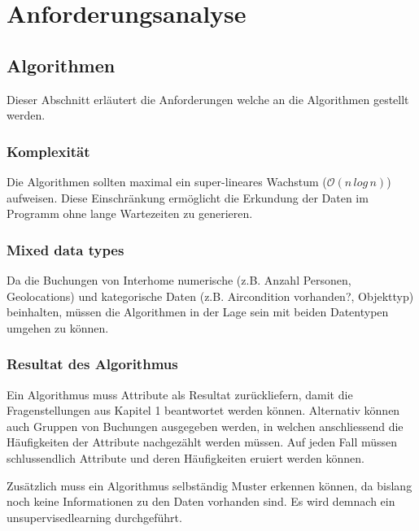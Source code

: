 

\chapter{Anforderungsanalyse}
\label{sec:anforderungsanalyse}

\section{Algorithmen}
\label{sec:anforderungsanalyse:algorithmen}
Dieser Abschnitt erläutert die Anforderungen welche an die Algorithmen gestellt werden.

\subsection{Komplexität}
\label{sec:anforderungsanalyse:algorithmen:komplexitaet}
Die Algorithmen sollten maximal ein super-lineares Wachstum ($\mathcal{O}(n\,log\,n)$) aufweisen. Diese Einschränkung ermöglicht die Erkundung der Daten im Programm ohne lange Wartezeiten zu generieren.

\subsection{Mixed data types}
\label{sec:anforderungsanalyse:algorithmen:mixed-data-types}
Da die Buchungen von Interhome numerische (z.B. Anzahl Personen, Geolocations) und kategorische Daten (z.B. Aircondition vorhanden?, Objekttyp) beinhalten, müssen die Algorithmen in der Lage sein mit beiden Datentypen umgehen zu können.

\subsection{Resultat des Algorithmus}
\label{sec:anforderungsanalyse:algorithmen:resultat}
Ein Algorithmus muss Attribute als Resultat zurückliefern, damit die Fragenstellungen aus Kapitel 1 beantwortet werden können. Alternativ können auch Gruppen von Buchungen ausgegeben werden, in welchen anschliessend die Häufigkeiten der Attribute nachgezählt werden müssen. Auf jeden Fall müssen schlussendlich Attribute und deren Häufigkeiten eruiert werden können.

Zusätzlich muss ein Algorithmus selbständig Muster erkennen können, da bislang noch keine Informationen zu den Daten vorhanden sind. Es wird demnach ein \gls{unsupervisedlearning} durchgeführt.

